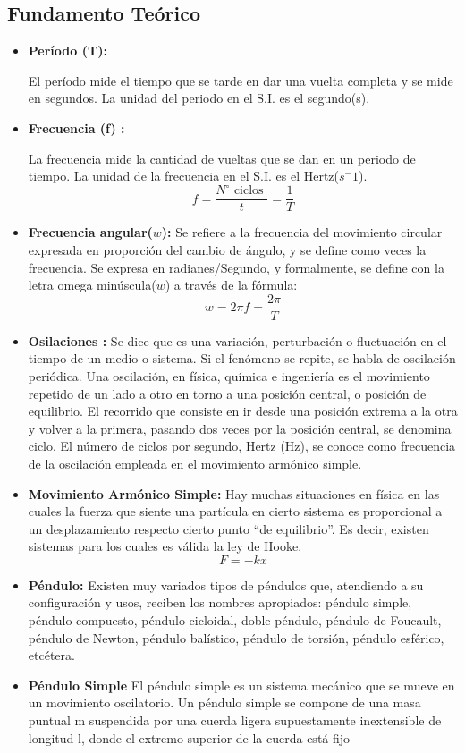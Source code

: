 \subsection{Fundamento Teórico}
\begin{itemize}
    \item \textbf{Período (T):}

El período mide el tiempo que se tarde en dar una vuelta completa y se mide en segundos.
La unidad del periodo en el S.I. es el segundo(s). 
    \item \textbf{Frecuencia (f) :}
    
    La frecuencia mide la cantidad de vueltas que se dan en un periodo de tiempo. La unidad de
la frecuencia en el S.I. es el Hertz($s^-1$). 
\begin{equation*}
    f=\dfrac{N^{\circ} \text { ciclos }}{t}=\dfrac{1}{T}    
\end{equation*}
    \item \textbf{Frecuencia angular($w$):}
Se refiere a la frecuencia del movimiento circular expresada en proporción del cambio de
ángulo, y se define como veces la frecuencia. Se expresa en radianes/Segundo, y formalmente,
se define con la letra omega minúscula($w$) a través de la fórmula: 
    \begin{equation*}
        w=2\pi f=\dfrac{2\pi}T
    \end{equation*}
    \item \textbf{Osilaciones :}
    Se dice que es una variación, perturbación o fluctuación en el tiempo de un medio o sistema. Si
el fenómeno se repite, se habla de oscilación periódica.
Una oscilación, en física, química e ingeniería es el movimiento repetido de un lado a otro en
torno a una posición central, o posición de equilibrio. El recorrido que consiste en ir desde una
posición extrema a la otra y volver a la primera, pasando dos veces por la posición central, se
denomina ciclo. El número de ciclos por segundo, Hertz (Hz), se conoce como frecuencia de la
oscilación empleada en el movimiento armónico simple.
    \item \textbf{Movimiento Armónico Simple:}
Hay muchas situaciones en física en las cuales la fuerza que siente una partícula en cierto
sistema es proporcional a un desplazamiento respecto cierto punto “de equilibrio”. Es decir,
existen sistemas para los cuales es válida la ley de Hooke.
\begin{equation*}
    F = -kx
\end{equation*}
    \item \textbf{Péndulo:}
Existen muy variados tipos de péndulos que, atendiendo a su configuración y usos,
reciben los nombres apropiados: péndulo simple, péndulo compuesto, péndulo cicloidal,
doble péndulo, péndulo de Foucault, péndulo de Newton, péndulo balístico, péndulo de
torsión, péndulo esférico, etcétera.
    \item \textbf{Péndulo Simple}
El péndulo simple es un sistema mecánico que se mueve en un movimiento oscilatorio.
Un péndulo simple se compone de una masa puntual m suspendida por una cuerda
ligera supuestamente inextensible de longitud l, donde el extremo superior de la cuerda
está fijo
\end{itemize}
